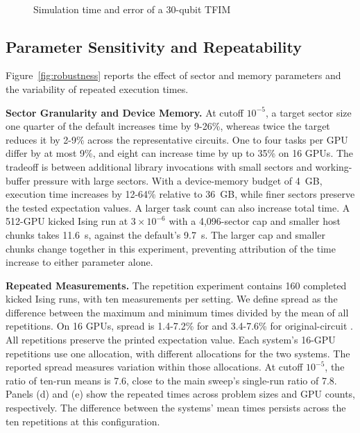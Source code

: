 \begin{figure}[t]
\centering
{}\\[-2pt]
\hfill
{}
\caption{Simulation time and error of a 30-qubit TFIM}
\label{fig:accuracy}
\end{figure}

\subsection{Parameter Sensitivity and Repeatability}
Figure~\ref{fig:robustness} reports the effect of sector and memory parameters and the variability of repeated execution times.

\noindent\textbf{Sector Granularity and Device Memory.}
At cutoff $10^{-5}$, a target sector size one quarter of the default increases time by 9-26\%, whereas twice the target reduces it by 2-9\% across the representative circuits.
One to four tasks per GPU differ by at most 9\%, and eight can increase time by up to 35\% on 16 GPUs.
The tradeoff is between additional library invocations with small sectors and working-buffer pressure with large sectors.
With a device-memory budget of 4~GB, execution time increases by 12-64\% relative to 36~GB, while finer sectors preserve the tested expectation values.
A larger task count can also increase total time.
A 512-GPU kicked Ising run at $3\times10^{-6}$ with a 4,096-sector cap and smaller host chunks takes 11.6~s, against the default's 9.7~s.
The larger cap and smaller chunks change together in this experiment, preventing attribution of the time increase to either parameter alone.

\noindent\textbf{Repeated Measurements.}
The repetition experiment contains 160 completed kicked Ising runs, with ten measurements per setting.
We define spread as the difference between the maximum and minimum times divided by the mean of all repetitions.
On 16 GPUs, spread is 1.4-7.2\% for \SectorQ and 3.4-7.6\% for original-circuit \cuPP.
All repetitions preserve the printed expectation value.
Each system's 16-GPU repetitions use one allocation, with different allocations for the two systems.
The reported spread measures variation within those allocations.
At cutoff $10^{-5}$, the ratio of ten-run means is 7.6, close to the main sweep's single-run ratio of 7.8.
Panels (d) and (e) show the repeated times across problem sizes and GPU counts, respectively.
The difference between the systems' mean times persists across the ten repetitions at this configuration.


